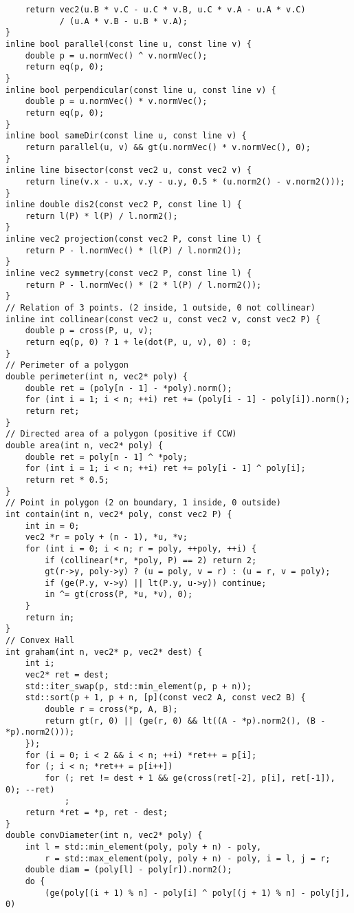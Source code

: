 \documentclass[twoside]{article}
\begin{document}
\begin{lstlisting}
	return vec2(u.B * v.C - u.C * v.B, u.C * v.A - u.A * v.C)
	       / (u.A * v.B - u.B * v.A);
}
inline bool parallel(const line u, const line v) {
	double p = u.normVec() ^ v.normVec();
	return eq(p, 0);
}
inline bool perpendicular(const line u, const line v) {
	double p = u.normVec() * v.normVec();
	return eq(p, 0);
}
inline bool sameDir(const line u, const line v) {
	return parallel(u, v) && gt(u.normVec() * v.normVec(), 0);
}
inline line bisector(const vec2 u, const vec2 v) {
	return line(v.x - u.x, v.y - u.y, 0.5 * (u.norm2() - v.norm2()));
}
inline double dis2(const vec2 P, const line l) {
	return l(P) * l(P) / l.norm2();
}
inline vec2 projection(const vec2 P, const line l) {
	return P - l.normVec() * (l(P) / l.norm2());
}
inline vec2 symmetry(const vec2 P, const line l) {
	return P - l.normVec() * (2 * l(P) / l.norm2());
}
// Relation of 3 points. (2 inside, 1 outside, 0 not collinear)
inline int collinear(const vec2 u, const vec2 v, const vec2 P) {
	double p = cross(P, u, v);
	return eq(p, 0) ? 1 + le(dot(P, u, v), 0) : 0;
}
// Perimeter of a polygon
double perimeter(int n, vec2* poly) {
	double ret = (poly[n - 1] - *poly).norm();
	for (int i = 1; i < n; ++i) ret += (poly[i - 1] - poly[i]).norm();
	return ret;
}
// Directed area of a polygon (positive if CCW)
double area(int n, vec2* poly) {
	double ret = poly[n - 1] ^ *poly;
	for (int i = 1; i < n; ++i) ret += poly[i - 1] ^ poly[i];
	return ret * 0.5;
}
// Point in polygon (2 on boundary, 1 inside, 0 outside)
int contain(int n, vec2* poly, const vec2 P) {
	int in = 0;
	vec2 *r = poly + (n - 1), *u, *v;
	for (int i = 0; i < n; r = poly, ++poly, ++i) {
		if (collinear(*r, *poly, P) == 2) return 2;
		gt(r->y, poly->y) ? (u = poly, v = r) : (u = r, v = poly);
		if (ge(P.y, v->y) || lt(P.y, u->y)) continue;
		in ^= gt(cross(P, *u, *v), 0);
	}
	return in;
}
// Convex Hall
int graham(int n, vec2* p, vec2* dest) {
	int i;
	vec2* ret = dest;
	std::iter_swap(p, std::min_element(p, p + n));
	std::sort(p + 1, p + n, [p](const vec2 A, const vec2 B) {
		double r = cross(*p, A, B);
		return gt(r, 0) || (ge(r, 0) && lt((A - *p).norm2(), (B - *p).norm2()));
	});
	for (i = 0; i < 2 && i < n; ++i) *ret++ = p[i];
	for (; i < n; *ret++ = p[i++])
		for (; ret != dest + 1 && ge(cross(ret[-2], p[i], ret[-1]), 0); --ret)
			;
	return *ret = *p, ret - dest;
}
double convDiameter(int n, vec2* poly) {
	int l = std::min_element(poly, poly + n) - poly,
	    r = std::max_element(poly, poly + n) - poly, i = l, j = r;
	double diam = (poly[l] - poly[r]).norm2();
	do {
		(ge(poly[(i + 1) % n] - poly[i] ^ poly[(j + 1) % n] - poly[j], 0)

\end{lstlisting}
\end{document}
